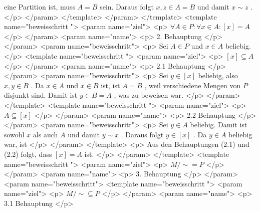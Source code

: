            eine Partition ist, muss
           $A=B$
           sein. Daraus folgt
           $x,z\in A=B$
           und damit
           $x\sim z$
           .
          </p>
         </param>
        </template>
       </param>
      </template>
      <template name="beweisschritt
 ">
       <param name="ziel">
        <p>
         $\forall A\in P:\forall x\in A: [x]=A$
        </p>
       </param>
       <param name="name">
        <p>
         2. Behauptung
        </p>
       </param>
       <param name="beweisschritt">
        <p>
         Sei
         $A\in P$
         und
         $x\in A$
         beliebig.
        </p>
        <template name="beweisschritt
 ">
         <param name="ziel">
          <p>
           $[x] \subseteq A$
          </p>
         </param>
         <param name="name">
          <p>
           2.1 Behauptung
          </p>
         </param>
         <param name="beweisschritt">
          <p>
           Sei
           $y\in [x]$
           beliebig, also
           $x,y\in B$
           . Da
           $x\in A$
           und
           $x\in B$
           ist, ist
           $A=B$
           , weil verschiedene Mengen von
           $P$
           disjunkt sind. Damit ist
           $y\in B=A$
           , was zu beweisen war.
          </p>
         </param>
        </template>
        <template name="beweisschritt
 ">
         <param name="ziel">
          <p>
           $A\subseteq [x]$
          </p>
         </param>
         <param name="name">
          <p>
           2.2 Behauptung
          </p>
         </param>
         <param name="beweisschritt">
          <p>
           Sei
           $y\in A$
           beliebig. Damit ist sowohl
           $x$
           als auch
           $A$
           und damit
           $y\sim x$
           . Daraus folgt
           $y\in [x]$
           . Da
           $y\in A$
           beliebig war, ist
          </p>
         </param>
        </template>
        <p>
         Aus den Behauptungen (2.1) und (2.2) folgt, dass
         $[x]=A$
         ist.
        </p>
       </param>
      </template>
      <template name="beweisschritt
 ">
       <param name="ziel">
        <p>
         $M/{\sim} = P$
        </p>
       </param>
       <param name="name">
        <p>
         3. Behauptung
        </p>
       </param>
       <param name="beweisschritt">
        <template name="beweisschritt
 ">
         <param name="ziel">
          <p>
           $M/{\sim} \subseteq P$
          </p>
         </param>
         <param name="name">
          <p>
           3.1 Behauptung
          </p>

